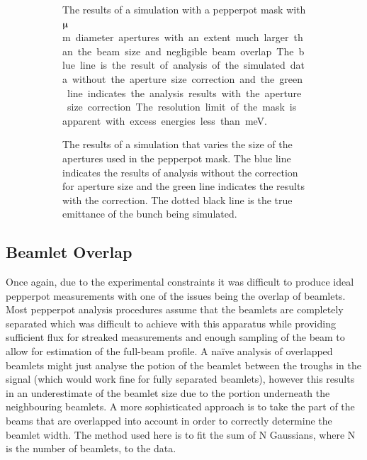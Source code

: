 \begin{figure}
\begin{subfigure}[b]{\textwidth}
    \center
    
    \caption[Results of a simulation investigating the efficacy of the aperture size correction for various electron excess energies.]{The results of a simulation with a pepperpot mask with \unit[50]{$\muup$m} diameter apertures with an extent much larger than the beam size and negligible beam overlap. The blue line is the result of analysis of the simulated data without the aperture size correction and the green line indicates the analysis results with the aperture size correction. The resolution limit of the mask is apparent with excess energies less than \unit[10]{meV}.}
    \label{figure:wavelength_sim}
\end{subfigure}

\begin{subfigure}[b]{\textwidth}
    \center
    
    \caption[Results of a simulation investigating the efficacy of the aperture size correction for various aperture sizes.]{The results of a simulation that varies the size of the apertures used in the pepperpot mask. The blue line indicates the results of analysis without the correction for aperture size and the green line indicates the results with the correction. The dotted black line is the true emittance of the bunch being simulated.}
    \label{figure:aperture_size_sim}
\end{subfigure}
    \caption[Results of a simulations investigating the efficacy of the aperture size correction for various excess energies and aperture sizes.]{}
\end{figure}

\subsection{Beamlet Overlap}
Once again, due to the experimental constraints it was difficult to produce ideal pepperpot measurements with one of the issues being the overlap of beamlets.
Most pepperpot analysis procedures assume that the beamlets are completely separated which was difficult to achieve with this apparatus while providing sufficient flux for streaked measurements and enough sampling of the beam to allow for estimation of the full-beam profile.
A na\"ive analysis of overlapped beamlets might just analyse the potion of the beamlet between the troughs in the signal (which would work fine for fully separated beamlets), however this results in an underestimate of the beamlet size due to the portion underneath the neighbouring beamlets.
A more sophisticated approach is to take the part of the beams that are overlapped into account in order to correctly determine the beamlet width.
The method used here is to fit the sum of N Gaussians, where N is the number of beamlets, to the data.

